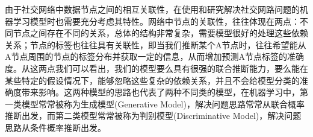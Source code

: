 由于社交网络中数据节点之间的相互关联性，在使用和研究解决社交网路问题的机器学习模型时也需要充分考虑其特性。网络中节点的关联性，往往体现在两点：不同节点之间存在不同的关系，总体的结构非常复杂，需要模型很好的处理这些依赖关系；节点的标签也往往具有关联性，即当我们推断某个A节点时，往往希望能从A节点周围的节点的标签分布并获取一定的信息，从而增加预测A节点标签的准确度。从这两点我们可以看出，我们的模型要么具有很强的联合推断能力，要么能在某些特定的假设情况下，能够忽略这些复杂的依赖关系，并且不会给模型分类的准确度带来影响。这两种模型的思路也代表了两种不同类的模型，在机器学习中，第一类模型常常被称为生成模型(Generative Model)，解决问题思路常常从联合概率推断出发，而第二类模型常常被称为判别模型(Discriminative Model)，解决问题思路从条件概率推断出发。

